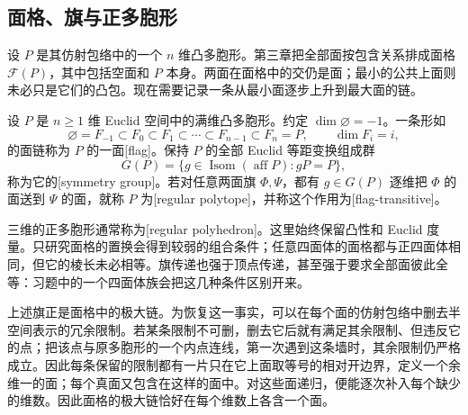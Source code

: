 \subsection{面格、旗与正多胞形}
\label{g1:subsec:E03:01}

设 \(P\) 是其仿射包络中的一个 \(n\) 维凸多胞形。第三章把全部面按包含关系排成面格 \(\mathcal F(P)\)，其中包括空面和 \(P\) 本身。两面在面格中的交仍是面；最小的公共上面则未必只是它们的凸包。现在需要记录一条从最小面逐步上升到最大面的链。

\begin{definition}[旗与正多胞形]
	\label{g1:def:regular-polytope-flag}
	设 \(P\) 是 \(n\ge1\) 维 Euclid 空间中的满维凸多胞形。约定 \(\dim\varnothing=-1\)。一条形如
	\[
		\varnothing=F_{-1}\subset F_0\subset F_1\subset\cdots
		\subset F_{n-1}\subset F_n=P,\qquad \dim F_i=i,
	\]
	的面链称为 \(P\) 的一面[flag]。保持 \(P\) 的全部 Euclid 等距变换组成群
	\[
		G(P)=\{g\in\operatorname{Isom}(\operatorname{aff}P):gP=P\},
	\]
	称为它的[symmetry group]。若对任意两面旗 \(\Phi,\Psi\)，都有 \(g\in G(P)\) 逐维把 \(\Phi\) 的面送到 \(\Psi\) 的面，就称 \(P\) 为[regular polytope]，并称这个作用为[flag-transitive]。
\end{definition}

三维的正多胞形通常称为[regular polyhedron]。这里始终保留凸性和 Euclid 度量。只研究面格的置换会得到较弱的组合条件；任意四面体的面格都与正四面体相同，但它的棱长未必相等。旗传递也强于顶点传递，甚至强于要求全部面彼此全等：习题中的一个四面体族会把这几种条件区别开来。

\ProseParagraphBreak

上述旗正是面格中的极大链。为恢复这一事实，可以在每个面的仿射包络中删去半空间表示的冗余限制。若某条限制不可删，删去它后就有满足其余限制、但违反它的点；把该点与原多胞形的一个内点连线，第一次遇到这条墙时，其余限制仍严格成立。因此每条保留的限制都有一片只在它上面取等号的相对开边界，定义一个余维一的面；每个真面又包含在这样的面中。对这些面递归，便能逐次补入每个缺少的维数。因此面格的极大链恰好在每个维数上各含一个面。

